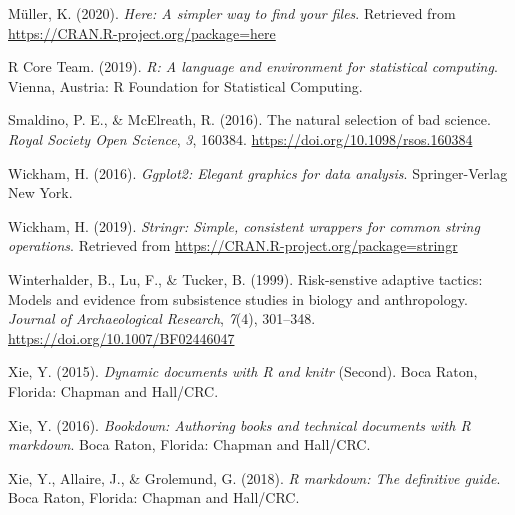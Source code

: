 \documentclass[british,,man,floatsintext]{apa6}
\begin{document}
\leavevmode\hypertarget{ref-R-here}{}%
Müller, K. (2020). \emph{Here: A simpler way to find your files}. Retrieved from \url{https://CRAN.R-project.org/package=here}

\leavevmode\hypertarget{ref-R-base}{}%
R Core Team. (2019). \emph{R: A language and environment for statistical computing}. Vienna, Austria: R Foundation for Statistical Computing.

\leavevmode\hypertarget{ref-Smaldino2016}{}%
Smaldino, P. E., \& McElreath, R. (2016). The natural selection of bad science. \emph{Royal Society Open Science}, \emph{3}, 160384. \url{https://doi.org/10.1098/rsos.160384}

\leavevmode\hypertarget{ref-R-ggplot2}{}%
Wickham, H. (2016). \emph{Ggplot2: Elegant graphics for data analysis}. Springer-Verlag New York.

\leavevmode\hypertarget{ref-R-stringr}{}%
Wickham, H. (2019). \emph{Stringr: Simple, consistent wrappers for common string operations}. Retrieved from \url{https://CRAN.R-project.org/package=stringr}

\leavevmode\hypertarget{ref-Winterhalder1999}{}%
Winterhalder, B., Lu, F., \& Tucker, B. (1999). Risk-senstive adaptive tactics: Models and evidence from subsistence studies in biology and anthropology. \emph{Journal of Archaeological Research}, \emph{7}(4), 301--348. \url{https://doi.org/10.1007/BF02446047}

\leavevmode\hypertarget{ref-R-knitr}{}%
Xie, Y. (2015). \emph{Dynamic documents with R and knitr} (Second). Boca Raton, Florida: Chapman and Hall/CRC.

\leavevmode\hypertarget{ref-R-bookdown}{}%
Xie, Y. (2016). \emph{Bookdown: Authoring books and technical documents with R markdown}. Boca Raton, Florida: Chapman and Hall/CRC.

\leavevmode\hypertarget{ref-R-rmarkdown}{}%
Xie, Y., Allaire, J., \& Grolemund, G. (2018). \emph{R markdown: The definitive guide}. Boca Raton, Florida: Chapman and Hall/CRC.
\end{document}
